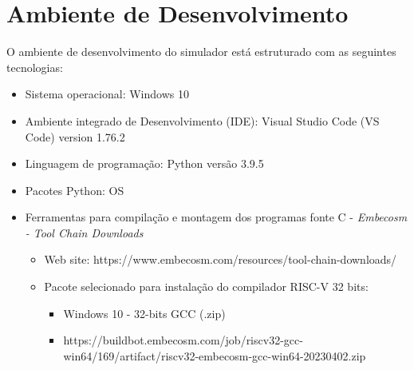 
\section{Ambiente de Desenvolvimento}

O ambiente de desenvolvimento do simulador está estruturado com as seguintes tecnologias:

\begin{itemize}
    \item Sistema operacional: Windows 10
    \item Ambiente integrado de Desenvolvimento (IDE): Visual Studio Code (VS Code) version 1.76.2
    \item Linguagem de programação: Python versão 3.9.5
    \item Pacotes Python: OS 
    \item Ferramentas para compilação e montagem dos programas fonte C - \textit{Embecosm - Tool Chain Downloads}
    \begin{itemize}
        \item Web site: https://www.embecosm.com/resources/tool-chain-downloads/
        \item Pacote selecionado para instalação do compilador RISC-V 32 bits: 
        \begin{itemize}
            \item Windows 10 - 32-bits GCC (.zip) 
            \item https://buildbot.embecosm.com/job/riscv32-gcc-win64/169/artifact/riscv32-embecosm-gcc-win64-20230402.zip            
        \end{itemize}
    \end{itemize}    
\end{itemize}
